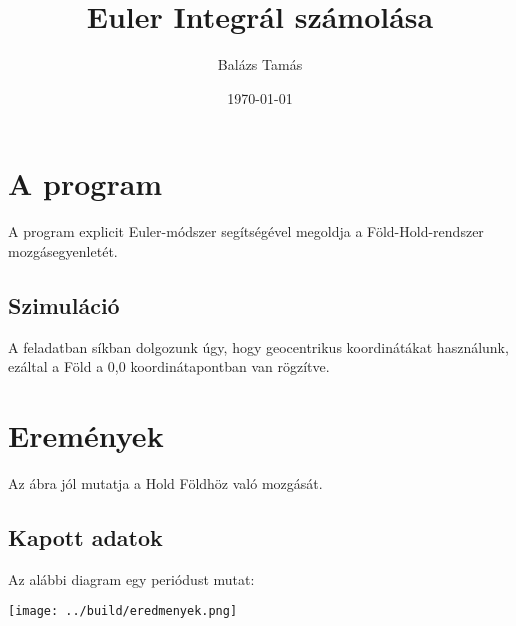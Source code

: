 \documentclass[twoside]{article}
\title{Euler Integrál számolása}
\date{\today}
\author{Balázs Tamás}
\begin{document}
	
	\maketitle
	\section*{A program}
		A program explicit Euler-módszer segítségével megoldja a Föld-Hold-rendszer mozgásegyenletét.
		\subsection*{Szimuláció}
		A feladatban síkban dolgozunk úgy, hogy geocentrikus koordinátákat használunk, ezáltal a Föld a 0,0 koordinátapontban van rögzítve.
		
	\section*{Eremények}
		\par Az ábra jól mutatja a Hold Földhöz való mozgását.
		\subsection*{Kapott adatok}	
		\par Az alábbi diagram egy periódust mutat:
		\begin{center}
			\texttt{[image: ../build/eredmenyek.png]}
		\end{center}
\end{document}
